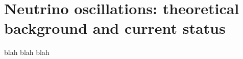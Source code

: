 \chapter{Neutrino oscillations: theoretical background and current status}
\label{chap:theory}

blah blah blah
